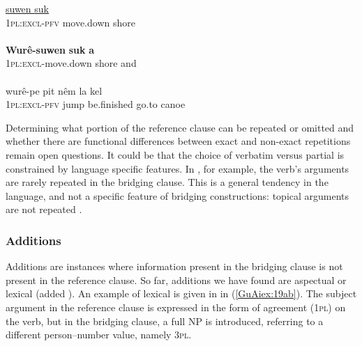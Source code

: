 \documentclass[output=paper]{LSP/langsci}
\begin{document}
\noindent\parbox{\textwidth}{%
\begin{exe}
\ex \label{GuAiex:18ac}
\begin{xlist}
\ex \label{GuAiex:18a}
\gll \underline{}   \underline{suwen }    \underline{suk}\\
\textsc{1pl:excl-pfv}  move.down  shore\\
\glt {} \\
\ex \label{GuAiex:18b}
\gll \textbf{Wurê-suwen}      \textbf{suk}  \textbf{ a} \\
\textsc{1pl:excl-}move.down    shore  and    \\
\glt {}\\
\ex \label{GuAiex:18c}
\gll wurê-pe   pit   nêm     la   kel \\
\textsc{1pl:excl-pfv} jump   be.finished   go.to   canoe\\
\glt {}
\end{xlist}
\end{exe}}



Determining what portion of the reference clause can be repeated or omitted and whether there are functional differences between exact and non-exact repetitions remain open questions. It could be that the choice of verbatim versus partial  is constrained by language specific features. In , for example, the verb’s arguments are rarely repeated in the bridging clause. This is a general tendency in the language, and not a specific feature of bridging constructions: topical arguments are not repeated \citep[][295--296]{vangijn14}. 

\subsubsection{Additions}
\label{GuAi313add}
Additions are instances where information present in the bridging clause is not present in the reference clause. So far, additions we have found are aspectual or lexical (added ). An example of lexical  is given in  in (\ref{GuAiex:19ab}). The subject argument in the reference clause is expressed in the form of agreement (\textsc{1pl}) on the verb, but in the bridging clause, a full NP is introduced, referring to a different person–number value, namely \textsc{3pl}.
\end{document}
